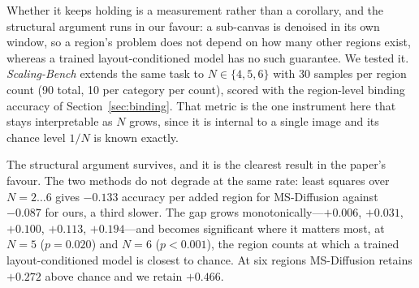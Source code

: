 \documentclass[10pt,twocolumn,letterpaper]{article}
\begin{document}
Whether it keeps holding is a measurement rather than a corollary, and the
structural argument runs in our favour: a sub-canvas is denoised in its own
window, so a region's problem does not depend on how many other regions
exist, whereas a trained layout-conditioned model has no such guarantee.  We
tested it.  \emph{Scaling-Bench} extends the same task to $N\in\{4,5,6\}$
with 30 samples per region count (90 total, 10 per category per count),
scored with the region-level binding accuracy of Section~\ref{sec:binding}.
That metric is the one instrument here that stays interpretable as $N$ grows,
since it is internal to a single image and its chance level $1/N$ is known
exactly.

\begin{table}[htbp]
\centering
\caption{%
  \textbf{Region-level binding accuracy against region count.}
  Scaling-Bench, 30 samples per $N$; the $N{=}2,3$ columns are the
  Mixed-Eval-v1 numbers of Table~\ref{tab:binding}, repeated for continuity.
  $\Delta$ and $p$ compare our default ($\tau{=}0.7$) against MS-Diffusion,
  paired and two-sided; the $\tau{=}0.5$ row is kept to separate the release
  point's contribution from the method's.  Both methods stay above chance at
  every $N$, and the gap between them grows monotonically with the number of
  regions, from $+0.006$ at two to $+0.194$ at six.%
}
\label{tab:scaling}
\end{table}

The structural argument survives, and it is the clearest result in the
paper's favour.  The two methods do not degrade at the same rate: least
squares over $N{=}2\ldots6$ gives $-0.133$ accuracy per added region for
MS-Diffusion against $-0.087$ for ours, a third slower.  The gap grows
monotonically---$+0.006$, $+0.031$, $+0.100$, $+0.113$, $+0.194$---and
becomes significant where it matters most, at $N{=}5$ ($p{=}0.020$) and
$N{=}6$ ($p{<}0.001$), the region counts at which a trained
layout-conditioned model is closest to chance.  At six regions MS-Diffusion
retains $+0.272$ above chance and we retain $+0.466$.
\end{document}
